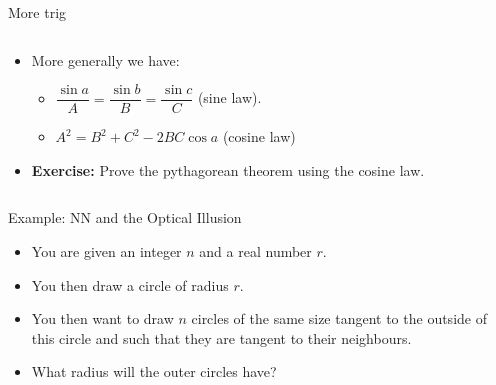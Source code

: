 \documentclass{beamer}
\begin{document}
\begin{frame}[plain]{More trig}
	\begin{columns}
		\begin{column}{0.7\textwidth}
			\begin{itemize}
				\item More generally we have:
				\begin{itemize}
					\item $\dfrac{\sin a}{A} = \dfrac{\sin b}{B} = \dfrac{\sin c}{C}$ (sine law).
					\item $A^2 = B^2 + C^2 - 2BC\cos a$ (cosine law)
                \end{itemize}
				\item {\bf Exercise:} Prove the pythagorean theorem using the cosine law.
            \end{itemize}
        \end{column}
		\begin{column}{0.3\textwidth}
			\scalebox{0.8} {
			}
        \end{column}
    \end{columns}
\end{frame}

\begin{frame}[plain]{Example: NN and the Optical Illusion}
	\begin{itemize}
        \item You are given an integer $n$ and a real number $r$.
        \item You then draw a circle of radius $r$.
        \item You then want to draw $n$ circles of the same size tangent to the outside of this circle and such that they are tangent to their neighbours.
        \item What radius will the outer circles have?
    \end{itemize}
\end{frame}
\end{document}

